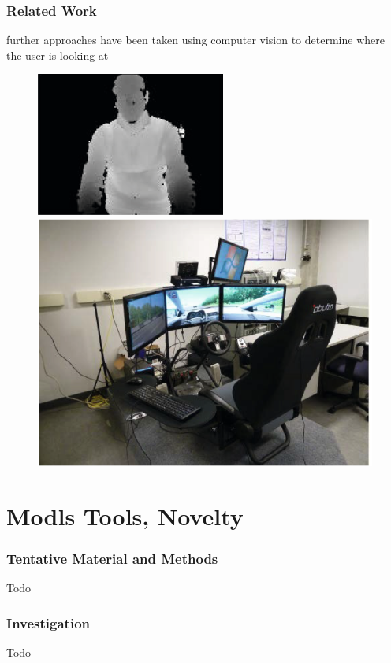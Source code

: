\documentclass{beamer}
\begin{document}
	
	\begin{frame}
		\frametitle{Related Work}
		further approaches have been taken using computer vision to determine where the user is looking at 
		
		
		\begin{figure}
			\includegraphics{RanFor}
			\includegraphics[scale = .365]{RanForSim}
		\end{figure}
		\begin{figure}
			
			
			
		\end{figure}
	\end{frame}
	
	\section{Modls Tools, Novelty}	
	\begin{frame}
		\frametitle{Tentative Material and Methods}
		Todo
	\end{frame}	
	
	\begin{frame}
		\frametitle{Investigation}
		Todo
	\end{frame}
	
\end{document}
